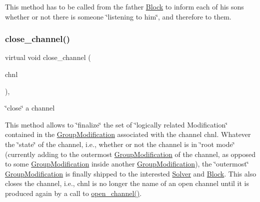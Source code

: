This method has to be called from the father \mbox{\hyperlink{class_s_m_spp__di__unipi__it_1_1_block}{Block}} to inform each of his sons whether or not there is someone \char`\"{}listening to him\char`\"{}, and therefore to them. \mbox{\label{class_s_m_spp__di__unipi__it_1_1_block_ae6ecad455eb1f431127411f27b5eb10f}} 
\subsubsection{\texorpdfstring{close\+\_\+channel()}{close\_channel()}}
{\footnotesize\ttfamily virtual void close\+\_\+channel (\begin{DoxyParamCaption}\item[{\mbox{\hyperlink{class_s_m_spp__di__unipi__it_1_1_observer_a54ce8db639626e45b1f20c289baa989b}{Chnl\+Name}}}]{chnl }\end{DoxyParamCaption})\hspace{0.3cm}{\ttfamily [override]}, {\ttfamily [virtual]}}



\char`\"{}close\char`\"{} a channel 

This method allows to \char`\"{}finalize\char`\"{} the set of \char`\"{}logically related
\+Modification\char`\"{} contained in the \mbox{\hyperlink{class_s_m_spp__di__unipi__it_1_1_group_modification}{Group\+Modification}} associated with the channel chnl. Whatever the \char`\"{}state\char`\"{} of the channel, i.\+e., whether or not the channel is in \char`\"{}root mode\char`\"{} (currently adding to the outermost \mbox{\hyperlink{class_s_m_spp__di__unipi__it_1_1_group_modification}{Group\+Modification}} of the channel, as opposed to some \mbox{\hyperlink{class_s_m_spp__di__unipi__it_1_1_group_modification}{Group\+Modification}} inside another \mbox{\hyperlink{class_s_m_spp__di__unipi__it_1_1_group_modification}{Group\+Modification}}), the \char`\"{}outermost\char`\"{} \mbox{\hyperlink{class_s_m_spp__di__unipi__it_1_1_group_modification}{Group\+Modification}} is finally shipped to the interested \mbox{\hyperlink{class_s_m_spp__di__unipi__it_1_1_solver}{Solver}} and \mbox{\hyperlink{class_s_m_spp__di__unipi__it_1_1_block}{Block}}. This also closes the channel, i.\+e., chnl is no longer the name of an open channel until it is produced again by a call to \mbox{\hyperlink{class_s_m_spp__di__unipi__it_1_1_block_a6459343d63aec3d39ece1e20467db47b}{open\+\_\+channel()}}.

